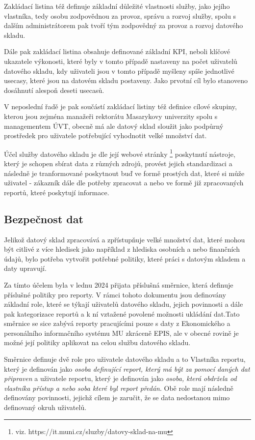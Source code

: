 \documentclass[
  digital,     %
  twoside,     %
  lof,         %
  lot,         %
]{fithesis4}
\begin{document}
Zakládací listina též definuje základní důležité vlastnosti služby, jako jejího vlastníka, tedy osobu zodpovědnou za provoz, správu a rozvoj služby, spolu s dalším administrátorem pak tvoří tým zodpovědný za provoz a rozvoj datového skladu.

Dále pak zakládací listina obsahuje definované základní KPI, neboli klíčové ukazatele výkonosti, které byly v tomto případě nastaveny na počet uživatelů datového skladu, kdy uživateli jsou v tomto případě myšleny spíše jednotlivé usecasy, které jsou na datovém skladu postaveny. Jako prvotní cíl bylo stanoveno dosáhnutí alespoň deseti usecasů.

V neposlední řadě je pak součástí zakládací listiny též definice cílové skupiny, kterou jsou zejména manažeři rektorátu Masarykovy univerzity spolu s managementem ÚVT, obecně má ale datový sklad sloužit jako podpůrný prostředek pro uživatele potřebující vyhodnotit velké množství dat.

Účel služby datového skladu je dle její webové stránky \footnote{viz. https://it.muni.cz/sluzby/datovy-sklad-na-mu} poskytnutí nástroje, který je schopen sbírat data z různých zdrojů, provést jejich standardizaci a následně je tranformované poskytnout buď ve formě prostých dat, které si může uživatel - zákazník dále dle potřeby zpracovat a nebo ve formě již zpracovaných reportů, které poskytují informace. 
\subsection{Bezpečnost dat}
Jelikož datový sklad zpracovává a zpřístupňuje velké množství dat, které mohou být citlivé z více hledisek jako například z hlediska osobních a nebo finančních údajů, bylo potřeba vytvořit potřebné politiky, které práci s datovým skladem a daty upravují. 

Za tímto účelem byla v lednu 2024 přijata příslušná směrnice, která definuje příslušné politiky pro reporty. V rámci tohoto dokumentu jsou definovány základní role, které se týkají uživatelů datového skladu, jejich povinnosti a dále pak kategorizace reportů a k ní vztažené povolené možnosti ukládání dat.Tato směrnice se sice zabývá reporty pracujícími pouze s daty z Ekonomického a personálního informačního systému MU zkráceně EPIS, ale v obecné rovině je možné její politiky aplikovat na celou službu datového skladu. 

Směrnice definuje dvě role pro uživatele datového skladu a to Vlastníka reportu, který je definován jako \emph{osoba definující report, který má být za pomocí daných dat připraven} a uživatele reportu, který je definován jako \emph{osoba, která obdržela od vlastníka přístup a nebo soba které byl report předán}. Obě role mají následně definovány povinnosti, jejichž cílem je zaručit, že se data nedostanou mimo definovaný okruh uživatelů. 
\end{document}
